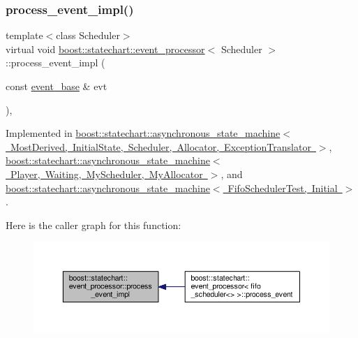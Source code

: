 \subsubsection{\texorpdfstring{process\+\_\+event\+\_\+impl()}{process\_event\_impl()}}
{\footnotesize\ttfamily template$<$class Scheduler$>$ \\
virtual void \mbox{\hyperlink{classboost_1_1statechart_1_1event__processor}{boost\+::statechart\+::event\+\_\+processor}}$<$ Scheduler $>$\+::process\+\_\+event\+\_\+impl (\begin{DoxyParamCaption}\item[{const \mbox{\hyperlink{classboost_1_1statechart_1_1event__base}{event\+\_\+base}} \&}]{evt }\end{DoxyParamCaption})\hspace{0.3cm}{\ttfamily [private]}, {}}



Implemented in \mbox{\hyperlink{classboost_1_1statechart_1_1asynchronous__state__machine_a3e4a4a8910ec610542fc41dba4fd2d04}{boost\+::statechart\+::asynchronous\+\_\+state\+\_\+machine$<$ Most\+Derived, Initial\+State, Scheduler, Allocator, Exception\+Translator $>$}}, \mbox{\hyperlink{classboost_1_1statechart_1_1asynchronous__state__machine_a3e4a4a8910ec610542fc41dba4fd2d04}{boost\+::statechart\+::asynchronous\+\_\+state\+\_\+machine$<$ Player, Waiting, My\+Scheduler, My\+Allocator $>$}}, and \mbox{\hyperlink{classboost_1_1statechart_1_1asynchronous__state__machine_a3e4a4a8910ec610542fc41dba4fd2d04}{boost\+::statechart\+::asynchronous\+\_\+state\+\_\+machine$<$ Fifo\+Scheduler\+Test, Initial $>$}}.

Here is the caller graph for this function\+:
\nopagebreak
\begin{figure}[H]
\begin{center}
\leavevmode
\includegraphics[width=350pt]{classboost_1_1statechart_1_1event__processor_a5db03beb4d6c1545e7bb9584cd60b500_icgraph}
\end{center}
\end{figure}
\mbox{\label{classboost_1_1statechart_1_1event__processor_a9134afd6e3f693e035f35d3af434dee9}} 
